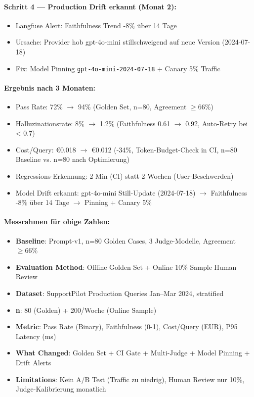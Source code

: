 \paragraph{Schritt 4 — Production Drift erkannt (Monat 2):}
\begin{itemize}
    \item Langfuse Alert: Faithfulness Trend -8\% über 14 Tage
    \item Ursache: Provider hob gpt-4o-mini stillschweigend auf neue Version (2024-07-18)
    \item Fix: Model Pinning \texttt{gpt-4o-mini-2024-07-18} + Canary 5\% Traffic
\end{itemize}

\paragraph{Ergebnis nach 3 Monaten:}
\begin{itemize}
    \item Pass Rate: 72\% $\to$ 94\% (Golden Set, n=80, Agreement $\geq 66\%$)
    \item Halluzinationsrate: 8\% $\to$ 1.2\% (Faithfulness 0.61 $\to$ 0.92, Auto-Retry bei < 0.7)
    \item Cost/Query: €0.018 $\to$ €0.012 (-34\%, Token-Budget-Check in CI, n=80 Baseline vs. n=80 nach Optimierung)
    \item Regressions-Erkennung: 2 Min (CI) statt 2 Wochen (User-Beschwerden)
    \item Model Drift erkannt: gpt-4o-mini Still-Update (2024-07-18) $\to$ Faithfulness -8\% über 14 Tage $\to$ Pinning + Canary 5\%
\end{itemize}

\paragraph{Messrahmen für obige Zahlen:}
\begin{itemize}
    \item \textbf{Baseline}: Prompt-v1, n=80 Golden Cases, 3 Judge-Modelle, Agreement $\geq 66\%$
    \item \textbf{Evaluation Method}: Offline Golden Set + Online 10\% Sample Human Review
    \item \textbf{Dataset}: SupportPilot Production Queries Jan–Mar 2024, stratified
    \item \textbf{n}: 80 (Golden) + 200/Woche (Online Sample)
    \item \textbf{Metric}: Pass Rate (Binary), Faithfulness (0-1), Cost/Query (EUR), P95 Latency (ms)
    \item \textbf{What Changed}: Golden Set + CI Gate + Multi-Judge + Model Pinning + Drift Alerts
    \item \textbf{Limitations}: Kein A/B Test (Traffic zu niedrig), Human Review nur 10\%, Judge-Kalibrierung monatlich
\end{itemize}


